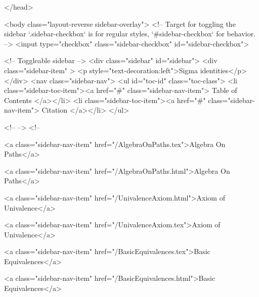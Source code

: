   
</head>




  <body class="layout-reverse sidebar-overlay">
    <!-- Target for toggling the sidebar `.sidebar-checkbox` is for regular
     styles, `#sidebar-checkbox` for behavior. -->
<input type="checkbox" class="sidebar-checkbox" id="sidebar-checkbox">

<!-- Toggleable sidebar -->
<div class="sidebar" id="sidebar">
  <div class="sidebar-item" >
    <p style="text-decoration:left">Sigma identities</p>
  </div>
  <nav class="sidebar-nav">
    <ul id="toc-id" class="toc-class">
  <li class="sidebar-toc-item"><a href="#" class="sidebar-nav-item"> Table of Contents </a></li>
  <li class="sidebar-toc-item"><a href="#" class="sidebar-nav-item"> Citation </a></li>
</ul>


    <!--  -->
    <!-- 
      
    
      
    
      
    
      
    
      
        
      
    
      
        
          <a class="sidebar-nav-item" href="/AlgebraOnPaths.tex">Algebra On Paths</a>
        
      
    
      
        
          <a class="sidebar-nav-item" href="/AlgebraOnPaths.html">Algebra On Paths</a>
        
      
    
      
        
          <a class="sidebar-nav-item" href="/UnivalenceAxiom.html">Axiom of Univalence</a>
        
      
    
      
        
          <a class="sidebar-nav-item" href="/UnivalenceAxiom.tex">Axiom of Univalence</a>
        
      
    
      
        
          <a class="sidebar-nav-item" href="/BasicEquivalences.tex">Basic Equivalences</a>
        
      
    
      
        
          <a class="sidebar-nav-item" href="/BasicEquivalences.html">Basic Equivalences</a>
        
